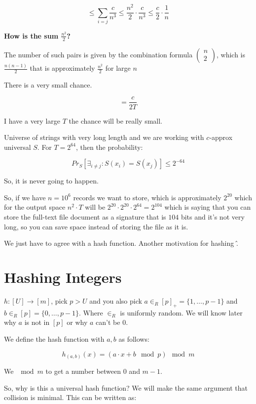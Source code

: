 \documentclass{article}
\begin{document}
$$
\leq \sum_{i = j} \frac{c}{n^3} \leq \frac{n^2}{2} \cdot \frac{c}{n^3} \leq \frac{c}{2} \cdot \frac{1}{n}
$$

\textbf{How is the sum $\frac{n^2}{2}$?}

The number of such pairs is given by the combination formula $\left(\begin{matrix}
    n \\
    2
\end{matrix}\right)$, which is $\frac{n(n-1)}{2}$ that is approximately $\frac{n^2}{2}$ for large $n$

There is a very small chance.

$$
= \frac{c}{2T}
$$

I have a very large $T$ the chance will be really small.

Universe of strings with very long length and we are working with $c$-approx universal $S$. For $T = 2^64$, then the probability:

$$
Pr_{S}[\exists_{i\neq j}: S(x_i) = S(x_j)] \leq 2^{-64}
$$

So, it is never going to happen.

So, if we have $n = 10^6$ records we want to store, which is approximately $2^{20}$ which for the output space $n^2 \cdot T$ will be $2^{20} \cdot 2^{20} \cdot 2^{64} = 2^{104}$ which is saying that you can store the full-text file document as a signature that is $104$ bits and it's not very long, so you can save space instead of storing the file as it is. 

We just have to agree with a hash function. Another motivation for hashing \^.

\section{Hashing Integers}

$h:[U] \rightarrow [m]$, pick $p > U$ and you also pick $a \in_{R} {[p]}_{+} = \{1, \ldots, p-1\}$ and $b \in_{R} {[p]} = \{0, \ldots, p-1\}$. Where $\in_{R}$ is uniformly random. We will know later why $a$ is not in ${[p]}$ or why $a$ can't be $0$.

We define the hash function with $a,b$ as follows:

$$
h_{(a,b)}(x) = (a \cdot x + b \mod p) \mod m
$$

We $\mod m$ to get a number between $0$ and $m-1$.

So, why is this a universal hash function? We will make the same argument that collision is minimal. This can be written as:
\end{document}
